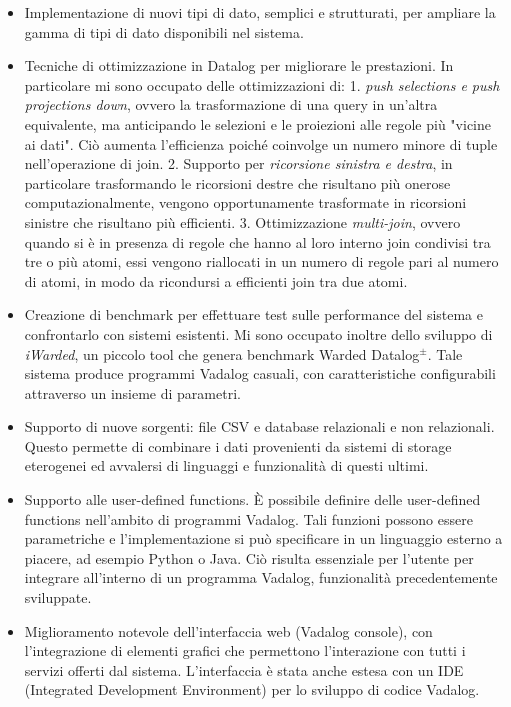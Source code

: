 \begin{itemize}
	\item Implementazione di nuovi tipi di dato, semplici e strutturati, per ampliare la gamma di tipi di dato disponibili nel sistema.
	\item Tecniche di ottimizzazione in Datalog per migliorare le prestazioni. In particolare mi sono occupato delle ottimizzazioni di: 1. \emph{push selections e push projections down}, ovvero la trasformazione di una query in un'altra equivalente, ma anticipando le selezioni e le proiezioni alle regole più "vicine ai dati". Ciò aumenta l'efficienza poiché coinvolge un numero minore di tuple nell'operazione di join. 2. Supporto per \emph{ricorsione sinistra e destra}, in particolare trasformando le ricorsioni destre che risultano più onerose computazionalmente, vengono opportunamente trasformate in ricorsioni sinistre che risultano più efficienti. 3. Ottimizzazione \emph{multi-join}, ovvero quando si è in presenza di regole che hanno al loro interno join condivisi tra tre o più atomi, essi vengono riallocati in un numero di regole pari al numero di atomi, in modo da ricondursi a efficienti join tra due atomi.
	\item Creazione di benchmark per effettuare test sulle performance del sistema e confrontarlo con sistemi esistenti. Mi sono occupato inoltre dello sviluppo di \textit{iWarded}, un piccolo tool che genera benchmark Warded Datalog$^\pm $. Tale sistema produce programmi Vadalog casuali, con caratteristiche configurabili attraverso un insieme di parametri.
	\item Supporto di nuove sorgenti: file CSV e database relazionali e non relazionali. Questo permette di combinare i dati provenienti da sistemi di storage eterogenei ed avvalersi di linguaggi e funzionalità di questi ultimi.
	\item Supporto alle user-defined functions. È possibile definire delle user-defined functions nell'ambito di programmi Vadalog. Tali funzioni possono essere parametriche e l'implementazione si può specificare in un linguaggio esterno a piacere, ad esempio Python o Java. Ciò risulta essenziale per l'utente per integrare all'interno di un programma Vadalog, funzionalità precedentemente sviluppate.
	\item Miglioramento notevole dell'interfaccia web (Vadalog console), con l'integrazione di elementi grafici che permettono l'interazione con tutti i servizi offerti dal sistema. L'interfaccia è stata anche estesa con un IDE (Integrated Development Environment) per lo sviluppo di codice Vadalog. \newline
\end{itemize} 
